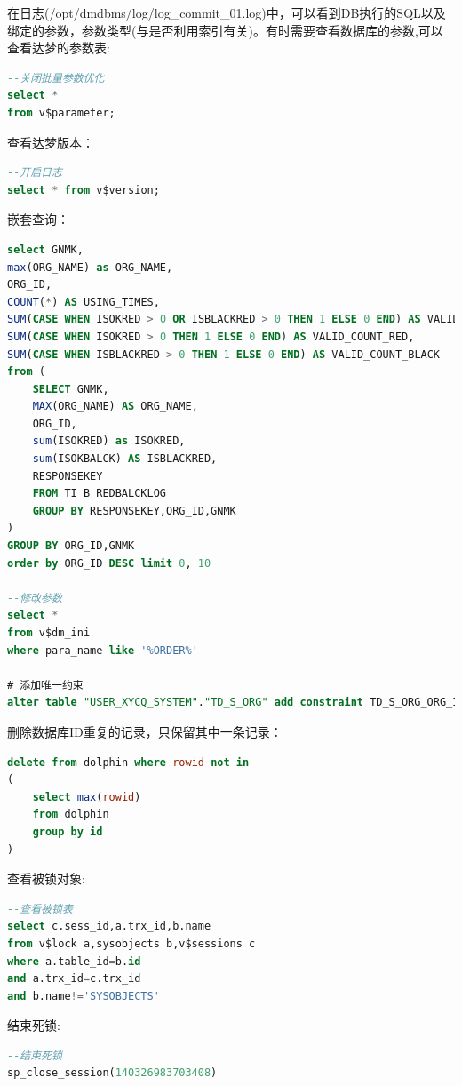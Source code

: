 \documentclass[12pt]{book}
\numberwithin{dummy}{section}
\theoremstyle{ocrenumbox}
\theoremstyle{blacknumex}
\theoremstyle{blacknumbox}
\theoremstyle{ocrenum}
\begin{document}
在日志(/opt/dmdbms/log/log\_commit\_01.log)中，可以看到DB执行的SQL以及绑定的参数，参数类型(与是否利用索引有关)。有时需要查看数据库的参数,可以查看达梦的参数表:

\begin{lstlisting}[language=SQL]
--关闭批量参数优化
select *
from v$parameter;
\end{lstlisting}


查看达梦版本：

\begin{lstlisting}[language=SQL]
--开启日志
select * from v$version;
\end{lstlisting}

嵌套查询：

\begin{lstlisting}[language=SQL]
select GNMK,
max(ORG_NAME) as ORG_NAME,
ORG_ID,
COUNT(*) AS USING_TIMES,
SUM(CASE WHEN ISOKRED > 0 OR ISBLACKRED > 0 THEN 1 ELSE 0 END) AS VALID_TIMES,
SUM(CASE WHEN ISOKRED > 0 THEN 1 ELSE 0 END) AS VALID_COUNT_RED,
SUM(CASE WHEN ISBLACKRED > 0 THEN 1 ELSE 0 END) AS VALID_COUNT_BLACK
from (
	SELECT GNMK,
	MAX(ORG_NAME) AS ORG_NAME,
	ORG_ID,
	sum(ISOKRED) as ISOKRED,
	sum(ISOKBALCK) AS ISBLACKRED,
	RESPONSEKEY	
	FROM TI_B_REDBALCKLOG  
	GROUP BY RESPONSEKEY,ORG_ID,GNMK 
)
GROUP BY ORG_ID,GNMK 
order by ORG_ID DESC limit 0, 10

--修改参数
select * 
from v$dm_ini
where para_name like '%ORDER%'

# 添加唯一约束
alter table "USER_XYCQ_SYSTEM"."TD_S_ORG" add constraint TD_S_ORG_ORG_ID_UNIQUE unique(org_id);
\end{lstlisting}

删除数据库ID重复的记录，只保留其中一条记录：

\begin{lstlisting}[language=SQL]
delete from dolphin where rowid not in
(
	select max(rowid) 
	from dolphin 
	group by id
) 
\end{lstlisting}

查看被锁对象:

\begin{lstlisting}[language=SQL]
--查看被锁表
select c.sess_id,a.trx_id,b.name
from v$lock a,sysobjects b,v$sessions c
where a.table_id=b.id
and a.trx_id=c.trx_id
and b.name!='SYSOBJECTS'
\end{lstlisting}

结束死锁:

\begin{lstlisting}[language=SQL]
--结束死锁
sp_close_session(140326983703408)
\end{lstlisting}
\end{document}
